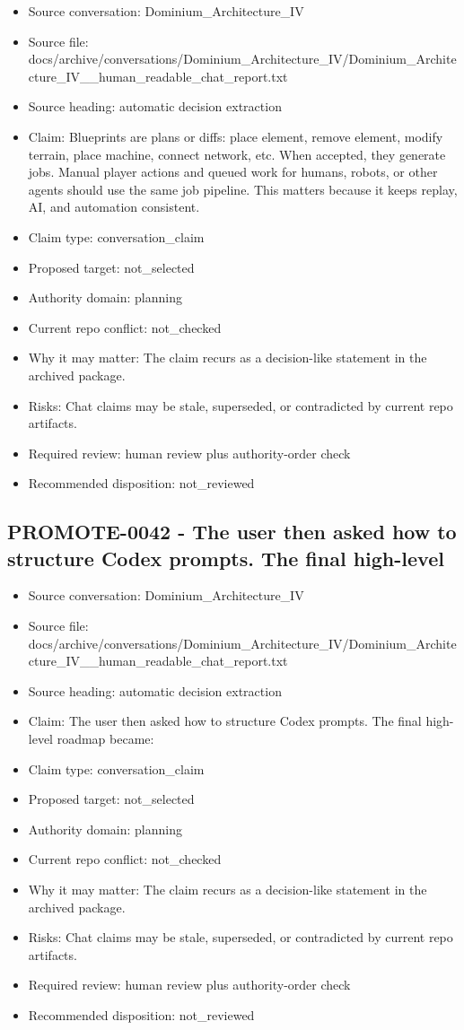 \documentclass[11pt,a4paper]{report}
\begin{document}
\begin{itemize}
\item Source conversation: Dominium\_Architecture\_IV
\item Source file: docs/archive/conversations/Dominium\_Architecture\_IV/Dominium\_Architecture\_IV\_\_human\_readable\_chat\_report.txt
\item Source heading: automatic decision extraction
\item Claim: Blueprints are plans or diffs: place element, remove element, modify terrain, place machine, connect network, etc. When accepted, they generate jobs. Manual player actions and queued work for humans, robots, or other agents should use the same job pipeline. This matters because it keeps replay, AI, and automation consistent.
\item Claim type: conversation\_claim
\item Proposed target: not\_selected
\item Authority domain: planning
\item Current repo conflict: not\_checked
\item Why it may matter: The claim recurs as a decision-like statement in the archived package.
\item Risks: Chat claims may be stale, superseded, or contradicted by current repo artifacts.
\item Required review: human review plus authority-order check
\item Recommended disposition: not\_reviewed
\end{itemize}

\subsection{PROMOTE-0042 - The user then asked how to structure Codex prompts. The final high-level}

\begin{itemize}
\item Source conversation: Dominium\_Architecture\_IV
\item Source file: docs/archive/conversations/Dominium\_Architecture\_IV/Dominium\_Architecture\_IV\_\_human\_readable\_chat\_report.txt
\item Source heading: automatic decision extraction
\item Claim: The user then asked how to structure Codex prompts. The final high-level roadmap became:
\item Claim type: conversation\_claim
\item Proposed target: not\_selected
\item Authority domain: planning
\item Current repo conflict: not\_checked
\item Why it may matter: The claim recurs as a decision-like statement in the archived package.
\item Risks: Chat claims may be stale, superseded, or contradicted by current repo artifacts.
\item Required review: human review plus authority-order check
\item Recommended disposition: not\_reviewed
\end{itemize}
\end{document}
